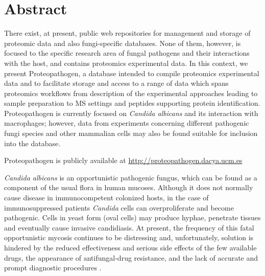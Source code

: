 \newpage

%
%



\chapter*{Abstract}

There exist, at present, public web repositories for management and storage of proteomic
data and also fungi-specific databases. None of them, however, is focused to the specific
research area of fungal pathogens and their interactions with the host, and contains
proteomics experimental data. In this context, we present Proteopathogen, a database
intended to compile proteomics experimental data and to facilitate storage and access to a
range of data which spans proteomics workflows from description of the experimental
approaches leading to sample preparation to MS settings and peptides supporting protein
identification. Proteopathogen is currently focused on \textit{Candida albicans} and its interaction
with macrophages; however, data from experiments concerning different pathogenic fungi
species and other mammalian cells may also be found suitable for inclusion into the database. 

Proteopathogen is publicly available at \href{http://proteopathogen.dacya.ucm.es}{http://proteopathogen.dacya.ucm.es}

\newpage{}

\textit{Candida albicans} is an opportunistic pathogenic fungus,
which can be found as a component of the usual flora in
human mucoses. Although it does not normally cause
disease in immunocompetent colonized hosts, in the case
of immunosuppressed patients \textit{Candida} cells can overproliferate
 and become pathogenic. Cells in yeast form (oval
cells) may produce hyphae, penetrate tissues and eventually
cause invasive candidiasis. At present, the frequency of this
fatal opportunistic mycosis continues to be distressing and,
unfortunately, solution is hindered by the reduced effectiveness
 and serious side effects of the few available drugs,
the appearance of antifungal-drug resistance, and the lack of
accurate and prompt diagnostic procedures \citep{Calderone2012}.

